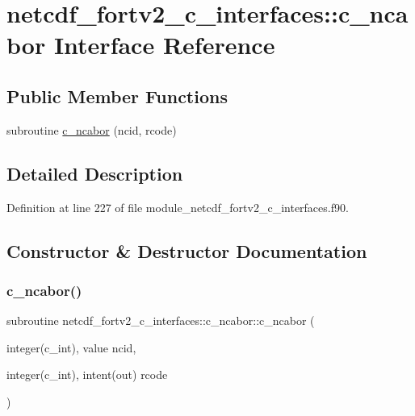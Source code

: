 \hypertarget{interfacenetcdf__fortv2__c__interfaces_1_1c__ncabor}{}\section{netcdf\+\_\+fortv2\+\_\+c\+\_\+interfaces\+:\+:c\+\_\+ncabor Interface Reference}
\label{interfacenetcdf__fortv2__c__interfaces_1_1c__ncabor}
\subsection*{Public Member Functions}
\begin{DoxyCompactItemize}
\item 
subroutine \hyperlink{interfacenetcdf__fortv2__c__interfaces_1_1c__ncabor_ac0394f40da14853c0da4bf5aefd55867}{c\+\_\+ncabor} (ncid, rcode)
\end{DoxyCompactItemize}


\subsection{Detailed Description}


Definition at line 227 of file module\+\_\+netcdf\+\_\+fortv2\+\_\+c\+\_\+interfaces.\+f90.



\subsection{Constructor \& Destructor Documentation}
\mbox{\label{interfacenetcdf__fortv2__c__interfaces_1_1c__ncabor_ac0394f40da14853c0da4bf5aefd55867}} 
\subsubsection{\texorpdfstring{c\+\_\+ncabor()}{c\_ncabor()}}
{\footnotesize\ttfamily subroutine netcdf\+\_\+fortv2\+\_\+c\+\_\+interfaces\+::c\+\_\+ncabor\+::c\+\_\+ncabor (\begin{DoxyParamCaption}\item[{integer(c\+\_\+int), value}]{ncid,  }\item[{integer(c\+\_\+int), intent(out)}]{rcode }\end{DoxyParamCaption})}



